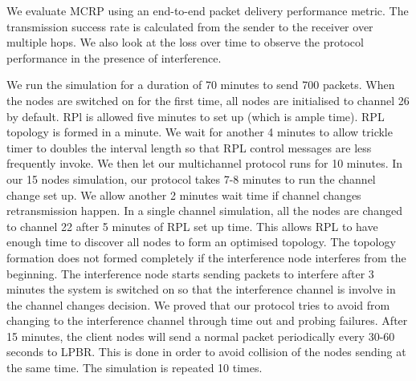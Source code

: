 

We evaluate MCRP using an end-to-end packet delivery performance metric. The transmission success rate is calculated from the sender to the receiver over multiple hops. We also look at the loss over time to observe the protocol performance in the presence of interference.


We run the simulation for a duration of 70 minutes to send 700 packets. When the nodes are switched on for the first time, all nodes are initialised to channel 26 by default. RPl is allowed five minutes to set up (which is ample time). RPL topology is formed in a minute. We wait for another 4 minutes to allow trickle timer to doubles the interval length so that RPL control messages are less frequently invoke. We then let our multichannel protocol runs for 10 minutes. In our 15 nodes simulation, our protocol takes 7-8 minutes to run the channel change set up. We allow another 2 minutes wait time if channel changes retransmission happen. In a single channel simulation, all the nodes are changed to channel 22 after 5 minutes of RPL set up time. This allows RPL to have enough time to discover all nodes to form an optimised topology. The topology formation does not formed completely if the interference node interferes from the beginning. The interference node starts sending packets to interfere after 3 minutes the system is switched on so that the interference channel is involve in the channel changes decision. We proved that our protocol tries to avoid from changing to the interference channel through time out and probing failures. After 15 minutes, the client nodes will send a normal packet periodically every 30-60 seconds to LPBR. This is done in order to avoid collision of the nodes sending at the same time. The simulation is repeated 10 times.



